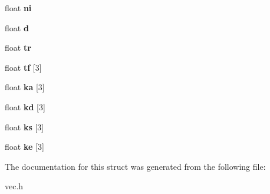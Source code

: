 \begin{DoxyCompactItemize}
\item 
\hypertarget{structMaterial_a9132d1f6cc468abe6c40659962e06236}{float {\bfseries ni}}\label{structMaterial_a9132d1f6cc468abe6c40659962e06236}

\item 
\hypertarget{structMaterial_a72cb289b8dccb7a08e0b0f7880a92803}{float {\bfseries d}}\label{structMaterial_a72cb289b8dccb7a08e0b0f7880a92803}

\item 
\hypertarget{structMaterial_a1912c2fa001d2df50882076c6b83ef26}{float {\bfseries tr}}\label{structMaterial_a1912c2fa001d2df50882076c6b83ef26}

\item 
\hypertarget{structMaterial_a59d28104e0b4fb52a80136ea2136e583}{float {\bfseries tf} \mbox{[}3\mbox{]}}\label{structMaterial_a59d28104e0b4fb52a80136ea2136e583}

\item 
\hypertarget{structMaterial_ab991cf8e96ff92584c599a0ed16b4c07}{float {\bfseries ka} \mbox{[}3\mbox{]}}\label{structMaterial_ab991cf8e96ff92584c599a0ed16b4c07}

\item 
\hypertarget{structMaterial_a81ac6613710953fa04446cd1c13f8e09}{float {\bfseries kd} \mbox{[}3\mbox{]}}\label{structMaterial_a81ac6613710953fa04446cd1c13f8e09}

\item 
\hypertarget{structMaterial_a0fe4913bbe46ec42aa7320548ad05b24}{float {\bfseries ks} \mbox{[}3\mbox{]}}\label{structMaterial_a0fe4913bbe46ec42aa7320548ad05b24}

\item 
\hypertarget{structMaterial_a492ba6bdcd27816f72640b66d6647b71}{float {\bfseries ke} \mbox{[}3\mbox{]}}\label{structMaterial_a492ba6bdcd27816f72640b66d6647b71}

\end{DoxyCompactItemize}


The documentation for this struct was generated from the following file\-:\begin{DoxyCompactItemize}
\item 
vec.\-h\end{DoxyCompactItemize}
